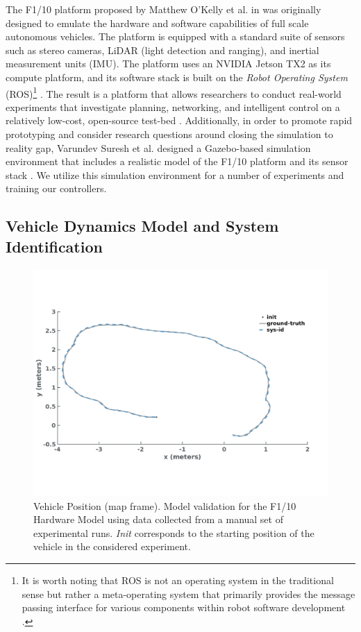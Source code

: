 \documentclass[manuscript,screen,review]{acmart}
\newcommand{\todo}[1]{\textcolor{red}{\textbf{\underline{TODO:}} #1}}
\begin{document}
The F1/10 platform proposed by Matthew O'Kelly et al. in \cite{F1102019} was originally designed to emulate the hardware and software capabilities of full scale autonomous vehicles. The platform is equipped with a standard suite of sensors such as stereo cameras, LiDAR (light detection and ranging), and inertial measurement units (IMU). The platform uses an NVIDIA Jetson TX2 as its compute platform, and its software stack is built on the \emph{Robot Operating System} (ROS)\footnote{It is worth noting that ROS is not an operating system in the traditional sense but rather a meta-operating system that primarily provides the message passing interface for various components within robot software development \cite{Huang2014}.} \cite{ROS}. The result is a platform that allows researchers to conduct real-world experiments that investigate planning, networking, and intelligent control on a relatively low-cost, open-source test-bed \cite{F1102019}. Additionally, in order to promote rapid prototyping and consider research questions around closing the simulation to reality gap\cite{Muratore2019}, Varundev Suresh et al. designed a Gazebo-based simulation environment \cite{Gazebo} that includes a realistic model of the F1/10 platform and its sensor stack \cite{varundev_ros_19}. We utilize this simulation environment for a number of experiments and training our controllers.


\subsection{Vehicle Dynamics Model and System Identification}


\begin{figure}[htbp]%
  \centering
    \includegraphics[width=0.70\linewidth]{figures/sys_id2_2.pdf}
  \caption{Vehicle Position (map frame). Model validation for the F1/10 Hardware Model using data collected from a manual set of experimental runs. \emph{Init} corresponds to the starting position of the vehicle in the considered experiment.}
  \label{fig:validation}
\end{figure}%
\end{document}
